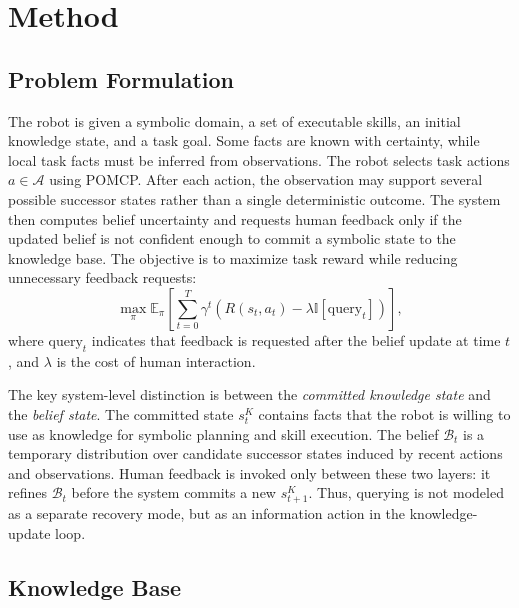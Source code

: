 \section{Method}
\label{sec:method}

\subsection{Problem Formulation}

The robot is given a symbolic domain, a set of executable skills, an initial knowledge state, and a task goal. Some facts are known with certainty, while local task facts must be inferred from observations. The robot selects task actions $a \in \mathcal{A}$ using POMCP. After each action, the observation may support several possible successor states rather than a single deterministic outcome. The system then computes belief uncertainty and requests human feedback only if the updated belief is not confident enough to commit a symbolic state to the knowledge base. The objective is to maximize task reward while reducing unnecessary feedback requests:
\begin{equation}
\max_{\pi} \mathbb{E}_{\pi}\left[\sum_{t=0}^{T}\gamma^t
\left(R(s_t,a_t)-\lambda \mathbb{I}[\mathrm{query}_t]\right)\right],
\label{eq:objective}
\end{equation}
where $\mathrm{query}_t$ indicates that feedback is requested after the belief update at time $t$, and $\lambda$ is the cost of human interaction.

The key system-level distinction is between the \emph{committed knowledge state} and the \emph{belief state}. The committed state $s^K_t$ contains facts that the robot is willing to use as knowledge for symbolic planning and skill execution. The belief $\mathcal{B}_t$ is a temporary distribution over candidate successor states induced by recent actions and observations. Human feedback is invoked only between these two layers: it refines $\mathcal{B}_t$ before the system commits a new $s^K_{t+1}$. Thus, querying is not modeled as a separate recovery mode, but as an information action in the knowledge-update loop.

\subsection{Knowledge Base}

